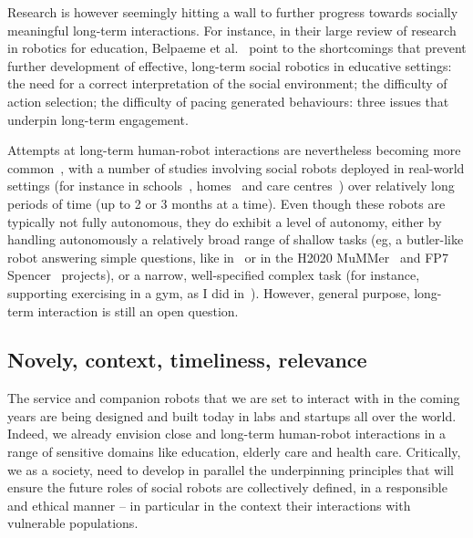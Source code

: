 Research is however seemingly hitting a wall to further progress towards
socially meaningful long-term interactions. For instance, in their large review
of research in robotics for education, Belpaeme et al.~\parencite{belpaeme2018social}
point to the shortcomings that prevent further development of effective,
long-term social robotics in educative settings: the need for a correct
interpretation of the social environment; the difficulty of action selection;
the difficulty of pacing generated behaviours: three issues that underpin
long-term engagement.

Attempts at long-term human-robot interactions are nevertheless becoming more
common~\parencite{kunze2018artificial,leite2013social}, with a number of studies
involving social robots deployed in real-world settings (for instance in
schools~\parencite{leite2014empathic,westlund2017measuring,
lemaignan2016learning,coninx2016towards}, homes~\parencite{degraaf2017phased} and
care centres~\parencite{hawes2017strands,winkle2020couch}) over relatively long
periods of time (up to 2 or 3 months at a time). Even though these robots are
typically not fully autonomous, they do exhibit a level of autonomy, either by
handling autonomously a relatively broad range of shallow tasks (eg, a
butler-like robot answering simple questions, like in~\parencite{hawes2017strands} or
in the H2020 MuMMer~\parencite{heikkila2018can} and FP7
Spencer~\parencite{triebel2016spencer} projects), or a narrow, well-specified complex
task (for instance, supporting exercising in a gym, as I did in~\parencite{winkle2020couch}).
However, general purpose, long-term interaction is still an open question.


\subsection{Novely, context, timeliness, relevance}

The service and companion robots that we are set to interact with in the coming
years are being designed and built today in labs and startups all over the
world. Indeed, we already envision close and long-term human-robot interactions
in a range of sensitive domains like education, elderly care and health care.
Critically, we as a society, need to develop in parallel the underpinning
principles that will ensure the future roles of social robots are collectively
defined, in a responsible and ethical manner -- in particular in the context
their interactions with vulnerable populations.


